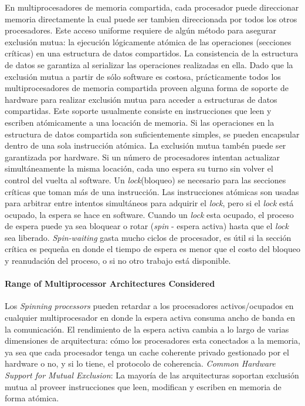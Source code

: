 En multiprocesadores de memoria compartida, cada procesador puede direccionar memoria directamente la cual puede ser tambien direccionada por todos los otros procesadores. Este acceso uniforme requiere de algún método para asegurar exclusión mutua: la ejecución lógicamente atómica de las operaciones (secciones críticas) en una estructura de datos compartidos. La consistencia de la estructura de datos se garantiza al serializar las operaciones realizadas en ella.
Dado que la exclusión mutua a partir de sólo software es costosa, prácticamente todos los multiprocesadores de memoria compartida proveen alguna forma de soporte de hardware para realizar exclusión mutua para acceder a estructuras de datos compartidas. Este soporte usualmente consiste en instrucciones que leen y escriben atómicamente a una locación de memoria. Si las operaciones en la estructura de datos compartida son suficientemente simples, se pueden encapsular dentro de una sola instrucción atómica. La exclusión mutua tambén puede ser garantizada por hardware. Si un número de procesadores intentan actualizar simultáneamente la misma locación, cada uno espera su turno sin volver el control del vuelta al software. Un \textit{lock}(bloqueo) se necesario para las secciones críticas que toman más de una instrucción. Las instrucciones atómicas son usadas para arbitrar entre intentos simultáneos para adquirir el \textit{lock}, pero si el \textit{lock} está ocupado, la espera se hace en software. Cuando un \textit{lock} esta ocupado, el proceso de espera puede ya sea bloquear o rotar (\textit{spin} - espera activa) hasta que el \textit{lock} sea liberado. \textit{Spin-waiting} gasta mucho ciclos de procesador, es útil si la sección crítica es pequeña en donde el tiempo de espera es menor que el costo del bloqueo y reanudación del proceso, o si no otro trabajo está disponible.

\paragraph{\textnormal{\textbf{Range of Multiprocessor Architectures Considered}}}
Los \textit{Spinning processors} pueden retardar a los procesadores activos/ocupados en cualquier multiprocesador en donde la espera activa consuma ancho de banda en la comunicación. El rendimiento de la espera activa cambia a lo largo de varias dimensiones de arquitectura: cómo los procesadores esta conectados a la memoria, ya sea que cada procesador tenga un cache coherente privado gestionado por el hardware o no, y si lo tiene, el protocolo de coherencia. \textit{Common Hardware Support for Mutual Exclusion}: La mayoría de las arquitecturas soportan exclusión mutua al proveer instrucciones que leen, modifican y escriben en memoria de forma atómica. 

